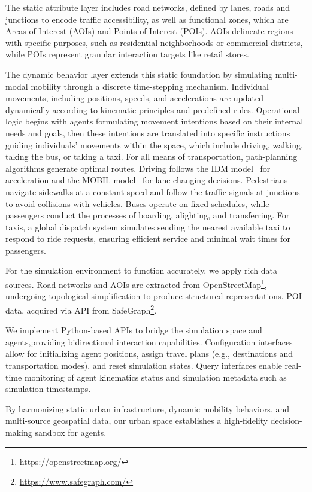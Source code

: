 The static attribute layer includes road networks, defined by lanes, roads and junctions to encode traffic accessibility, as well as functional zones, which are Areas of Interest (AOIs) and Points of Interest (POIs). 
AOIs delineate regions with specific purposes, such as residential neighborhoods or commercial districts, while POIs represent granular interaction targets like retail stores.

The dynamic behavior layer extends this static foundation by simulating multi-modal mobility through a discrete time-stepping mechanism. 
Individual movements, including positions, speeds, and accelerations are updated dynamically according to kinematic principles and predefined rules.
Operational logic begins with agents formulating movement intentions based on their internal needs and goals, then these intentions are translated into specific instructions guiding individuals' movements within the space, which include driving, walking, taking the bus, or taking a taxi.
For all means of transportation, path-planning algorithms generate optimal routes.
Driving follows the IDM model~\cite{treiber2000congested} for acceleration and the MOBIL model~\cite{kesting2007general,feng2021intelligent} for lane-changing decisions.
Pedestrians navigate sidewalks at a constant speed and follow the traffic signals at junctions to avoid collisions with vehicles.
Buses operate on fixed schedules, while passengers conduct the processes of boarding, alighting, and transferring. 
For taxis, a global dispatch system simulates sending the nearest available taxi to respond to ride requests, ensuring efficient service and minimal wait times for passengers.


For the simulation environment to function accurately, we apply rich data sources. 
Road networks and AOIs are extracted from OpenStreetMap\footnote{\url{https://openstreetmap.org/}}, undergoing topological simplification to produce structured representations. 
POI data, acquired via API from SafeGraph\footnote{\url{https://www.safegraph.com/}}.

We implement Python-based APIs to bridge the simulation space and agents,providing  bidirectional interaction capabilities. 
Configuration interfaces allow for initializing agent positions, assign travel plans (e.g., destinations and transportation modes), and reset simulation states. 
Query interfaces enable real-time monitoring of agent kinematics status and simulation metadata such as simulation timestamps. 

By harmonizing static urban infrastructure, dynamic mobility behaviors, and multi-source geospatial data, our urban space establishes a high-fidelity decision-making sandbox for agents. 



